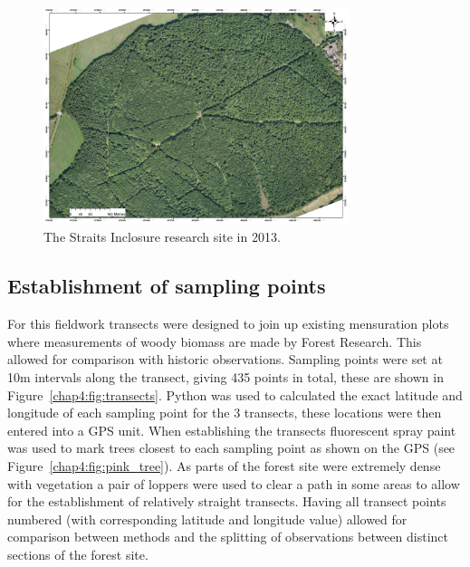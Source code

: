 \begin{figure}[ht]
    \centering
    \includegraphics[width=0.8\textwidth]{chapter/chapter4/AP1_2013.jpg}
    \caption{The Straits Inclosure research site in 2013.} \label{chap4:fig:ah_aerial_photo}
\end{figure}

\subsection{Establishment of sampling points} \label{chap4:sec:transect}

For this fieldwork transects were designed to join up existing mensuration plots where measurements of woody biomass are made by Forest Research. This allowed for comparison with historic observations. Sampling points were set at 10m intervals along the transect, giving 435 points in total, these are shown in Figure~\ref{chap4:fig:transects}. Python was used to calculated the exact latitude and longitude of each sampling point for the 3 transects, these locations were then entered into a GPS unit. When establishing the transects fluorescent spray paint was used to mark trees closest to each sampling point as shown on the GPS (see Figure~\ref{chap4:fig:pink_tree}). As parts of the forest site were extremely dense with vegetation a pair of loppers were used to clear a path in some areas to allow for the establishment of relatively straight transects. Having all transect points numbered (with corresponding latitude and longitude value) allowed for comparison between methods and the splitting of observations between distinct sections of the forest site. 


